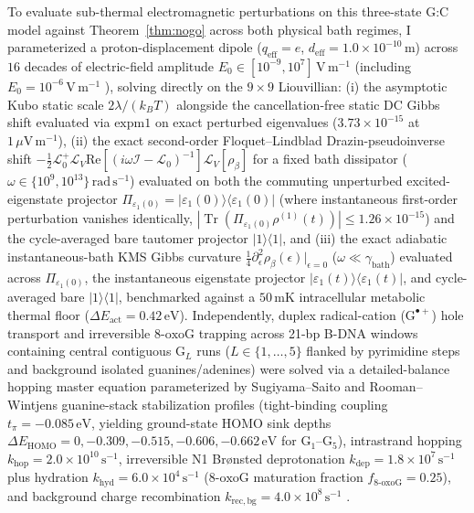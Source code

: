 \documentclass[10pt,letterpaper]{article}
\theoremstyle{plain}
\theoremstyle{definition}
\newcommand{\Lcal}{\mathcal{L}}
\newcommand{\Tr}{\operatorname{Tr}}
\newcommand{\oxog}{\text{8-oxoG}}
\begin{document}
To evaluate sub-thermal electromagnetic perturbations on this three-state G:C model against Theorem~\ref{thm:nogo} across both physical bath regimes, I parameterized a proton-displacement dipole ($q_{\mathrm{eff}} = e$, $d_{\mathrm{eff}} = 1.0 \times 10^{-10}\,\mathrm{m}$) across $16$ decades of electric-field amplitude $E_0 \in [10^{-9}, 10^7]\,\mathrm{V\,m^{-1}}$ (including $E_0 = 10^{-6}\,\mathrm{V\,m^{-1}}$ \cite{garcia2026dna}), solving directly on the $9 \times 9$ Liouvillian: (i) the asymptotic Kubo static scale $2\lambda/(k_B T)$ alongside the cancellation-free static DC Gibbs shift evaluated via $\mathrm{expm1}$ on exact perturbed eigenvalues ($3.73 \times 10^{-15}$ at $1\,\mu\mathrm{V\,m^{-1}}$), (ii) the exact second-order Floquet--Lindblad Drazin-pseudoinverse shift $-\frac{1}{2}\Lcal_0^+\Lcal_V\mathrm{Re}[(i\omega\mathcal{I}-\Lcal_0)^{-1}]\Lcal_V[\rho_\beta]$ for a fixed bath dissipator ($\omega \in \{10^9, 10^{13}\}\,\mathrm{rad\,s^{-1}}$) evaluated on both the commuting unperturbed excited-eigenstate projector $\Pi_{\varepsilon_1(0)} = |\varepsilon_1(0)\rangle\langle\varepsilon_1(0)|$ (where instantaneous first-order perturbation vanishes identically, $|\Tr(\Pi_{\varepsilon_1(0)}\rho^{(1)}(t))| \le 1.26 \times 10^{-15}$) and the cycle-averaged bare tautomer projector $|1\rangle\langle 1|$, and (iii) the exact adiabatic instantaneous-bath KMS Gibbs curvature $\frac{1}{4}\partial_\epsilon^2\rho_\beta(\epsilon)|_{\epsilon=0}$ ($\omega \ll \gamma_{\mathrm{bath}}$) evaluated across $\Pi_{\varepsilon_1(0)}$, the instantaneous eigenstate projector $|\varepsilon_1(t)\rangle\langle\varepsilon_1(t)|$, and cycle-averaged bare $|1\rangle\langle 1|$, benchmarked against a $50\,\mathrm{mK}$ intracellular metabolic thermal floor ($\Delta E_{\mathrm{act}} = 0.42\,\mathrm{eV}$). Independently, duplex radical-cation ($\mathrm{G}^{\bullet+}$) hole transport and irreversible $\oxog$ trapping across 21-bp B-DNA windows containing central contiguous $\mathrm{G}_L$ runs ($L \in \{1,\dots,5\}$ flanked by pyrimidine steps and background isolated guanines/adenines) were solved via a detailed-balance hopping master equation parameterized by Sugiyama--Saito and Rooman--Wintjens guanine-stack stabilization profiles (tight-binding coupling $t_\pi = -0.085\,\mathrm{eV}$, yielding ground-state HOMO sink depths $\Delta E_{\mathrm{HOMO}} = 0, -0.309, -0.515, -0.606, -0.662\,\mathrm{eV}$ for $\mathrm{G}_1$--$\mathrm{G}_5$), intrastrand hopping $k_{\mathrm{hop}} = 2.0 \times 10^{10}\,\mathrm{s}^{-1}$, irreversible N1 Br\o nsted deprotonation $k_{\mathrm{dep}} = 1.8 \times 10^7\,\mathrm{s}^{-1}$ plus hydration $k_{\mathrm{hyd}} = 6.0 \times 10^4\,\mathrm{s}^{-1}$ ($\oxog$ maturation fraction $f_{\oxog} = 0.25$), and background charge recombination $k_{\mathrm{rec,bg}} = 4.0 \times 10^8\,\mathrm{s}^{-1}$ \cite{rokhlenko2014jacs,rooman2014ioniz}.
\end{document}
